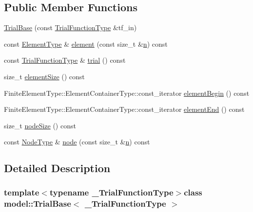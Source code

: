 \subsection*{Public Member Functions}
\begin{DoxyCompactItemize}
\item 
\hyperlink{classmodel_1_1_trial_base_a1a0e706311d6bf13613b893a2addab33}{Trial\+Base} (const \hyperlink{classmodel_1_1_trial_base_a421d094169b46baf6aee809f3b76b4dd}{Trial\+Function\+Type} \&tf\+\_\+in)
\item 
const \hyperlink{classmodel_1_1_trial_base_a124e38df0c40239e484ce9e4e7f4f688}{Element\+Type} \& \hyperlink{classmodel_1_1_trial_base_a0ed8aa2046968b06ebc4333b30b80291}{element} (const size\+\_\+t \&\hyperlink{_f_e_m_2linear__elasticity__3d_2tetgen_2generate_p_o_l_ycube_8m_a74637fc31d6aedd6d61cdc0c8154bc13}{n}) const 
\item 
const \hyperlink{classmodel_1_1_trial_base_a421d094169b46baf6aee809f3b76b4dd}{Trial\+Function\+Type} \& \hyperlink{classmodel_1_1_trial_base_ae0bf8cc58a099331e16c342e9463df11}{trial} () const 
\item 
size\+\_\+t \hyperlink{classmodel_1_1_trial_base_aeb8fb4ad867e2e26dffd001342fb1299}{element\+Size} () const 
\item 
Finite\+Element\+Type\+::\+Element\+Container\+Type\+::const\+\_\+iterator \hyperlink{classmodel_1_1_trial_base_a3e5561ffc6c7a0c4ca5be5024493ec48}{element\+Begin} () const 
\item 
Finite\+Element\+Type\+::\+Element\+Container\+Type\+::const\+\_\+iterator \hyperlink{classmodel_1_1_trial_base_ac108abca164f171024f9868e4fa455fb}{element\+End} () const 
\item 
size\+\_\+t \hyperlink{classmodel_1_1_trial_base_ad4493c5e3b8d23ae8b2e2ffd16db7be7}{node\+Size} () const 
\item 
const \hyperlink{classmodel_1_1_trial_base_a97477f1b794cf8fd2f1eadd4ea88da65}{Node\+Type} \& \hyperlink{classmodel_1_1_trial_base_a6e67adf5c2592dd1ee16b9e4e91eeb76}{node} (const size\+\_\+t \&\hyperlink{_f_e_m_2linear__elasticity__3d_2tetgen_2generate_p_o_l_ycube_8m_a74637fc31d6aedd6d61cdc0c8154bc13}{n}) const 
\end{DoxyCompactItemize}


\subsection{Detailed Description}
\subsubsection*{template$<$typename \+\_\+\+Trial\+Function\+Type$>$class model\+::\+Trial\+Base$<$ \+\_\+\+Trial\+Function\+Type $>$}

